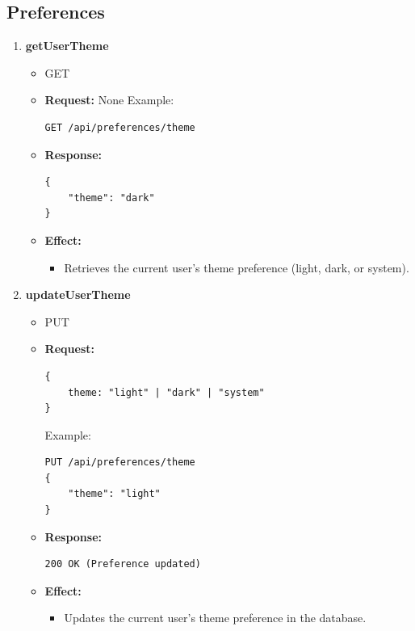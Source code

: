 \documentclass[12pt, a4paper]{article}
\begin{document}
\subsection{Preferences}
\begin{enumerate}
    \item \textbf{getUserTheme}
    \begin{itemize}
        \item GET 
        \item \textbf{Request:} None
        Example:
        \begin{verbatim}
GET /api/preferences/theme
        \end{verbatim}
        \item \textbf{Response:}
        \begin{verbatim}
{
    "theme": "dark"
}
        \end{verbatim}
        \item \textbf{Effect:}
        \begin{itemize}
            \item Retrieves the current user's theme preference (light, dark, or system).
        \end{itemize}
    \end{itemize}
    \item \textbf{updateUserTheme}
    \begin{itemize}
        \item PUT 
        \item \textbf{Request:}
        \begin{verbatim}
{
    theme: "light" | "dark" | "system"
}
        \end{verbatim}
        Example:
        \begin{verbatim}
PUT /api/preferences/theme
{
    "theme": "light"
}
        \end{verbatim}
        \item \textbf{Response:}
        \begin{verbatim}
200 OK (Preference updated)
        \end{verbatim}
        \item \textbf{Effect:}
        \begin{itemize}
            \item Updates the current user's theme preference in the database.
        \end{itemize}
    \end{itemize}
\end{enumerate}
\end{document}
